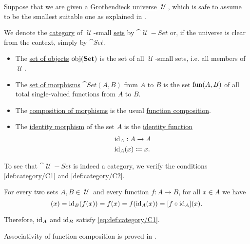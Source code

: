 \begin{definition}\label{def:category_of_small_sets}
  Suppose that we are given a \hyperref[def:grothendieck_universe]{Grothendieck universe} \( \mscrU \), which is safe to assume to be the smallest suitable one as explained in .

  We denote the \hyperref[def:category]{category} of \( \mscrU \)-small \hyperref[def:set]{sets} by \( \cat{\mscrU-Set} \) or, if the universe is clear from the context, simply by \( \cat{Set} \).

  \begin{itemize}
    \item The \hyperref[def:category/objects]{set of objects} \( \operatorname{obj}(\operatorname{\mathbf{Set}}) \) is the set of all \( \mscrU \)-small sets, i.e. all members of \( \mscrU \).

    \item The \hyperref[def:category/morphisms]{set of morphisms} \( \cat{Set}(A, B) \) from \( A \) to \( B \) is the set \hyperref[def:function/set_of_functions]{\( \operatorname{fun}(A, B) \)} of all total single-valued functions from \( A \) to \( B \).

    \item The \hyperref[def:category/composition]{composition of morphisms} is the usual \hyperref[def:multi_valued_function/composition]{function composition}.

    \item The \hyperref[def:category/identity]{identity morphism} of the set \( A \) is the \hyperref[def:multi_valued_function/identity]{identity function}
    \begin{equation*}
      \begin{aligned}
        &\operatorname{id}_A: A \to A \\
        &\operatorname{id}_A(x) \coloneqq x.
      \end{aligned}
    \end{equation*}
  \end{itemize}
\end{definition}
\begin{defproof}
  To see that \( \cat{\mscrU-Set} \) is indeed a category, we verify the conditions \ref{def:category/C1} and \ref{def:category/C2}.

   For every two sets \( A, B \in \mscrU \) and every function \( f: A \to B \), for all \( x \in A \) we have
  \begin{equation*}
    [\id_B \bincirc f](x)
    =
    \id_B(f(x))
    =
    f(x)
    =
    f(\id_A(x))
    =
    [f \bincirc \id_A](x).
  \end{equation*}

  Therefore, \( \operatorname{id}_A \) and \( \operatorname{id}_B \) satisfy \eqref{eq:def:category/C1}.

   Associativity of function composition is proved in .
\end{defproof}

